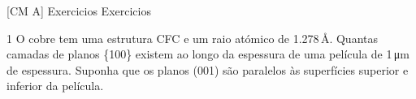 \documentclass[\mainfilename]{subfiles}
\begin{document}
\graphicspath{{\subfix{./.build/figures/CM_A-Exercicios_Resolucoes.1}}}

[CM A]
{Exercicios} %
{Exercicios} %

\setcounter{question}{5}
\begin{questionBox}1{ %
    O cobre tem uma estrutura CFC e um raio atómico de 1.278\,\si{\angstrom}. Quantas camadas de planos \{100\} existem ao longo da espessura de uma película de 1\,\si{\micro\metre} de espessura. Suponha que os planos (001) são paralelos às superfícies superior e inferior da película.
} %
    \answer{}
    \begin{center}
        
    \end{center}
\end{questionBox}
\end{document}
